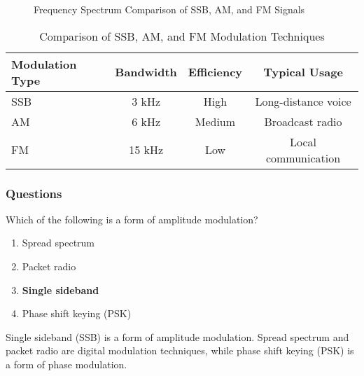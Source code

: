 \begin{figure}[h]
    \centering
    \caption{Frequency Spectrum Comparison of SSB, AM, and FM Signals}
    \label{fig:ssb-spectrum}
\end{figure}

\begin{table}[h]
    \centering
    \begin{tabular}{|l|c|c|c|}
        \hline
        \textbf{Modulation Type} & \textbf{Bandwidth} & \textbf{Efficiency} & \textbf{Typical Usage} \\
        \hline
        SSB & 3 kHz & High & Long-distance voice \\
        AM & 6 kHz & Medium & Broadcast radio \\
        FM & 15 kHz & Low & Local communication \\
        \hline
    \end{tabular}
    \caption{Comparison of SSB, AM, and FM Modulation Techniques}
    \label{tab:modulation-comparison}
\end{table}

\subsubsection{Questions}

\begin{tcolorbox}[colback=gray!10!white,colframe=black!75!black,title={T8A01}]
    Which of the following is a form of amplitude modulation?
    \begin{enumerate}[label=\Alph*),noitemsep]
        \item Spread spectrum
        \item Packet radio
        \item \textbf{Single sideband}
        \item Phase shift keying (PSK)
    \end{enumerate}
\end{tcolorbox}
Single sideband (SSB) is a form of amplitude modulation. Spread spectrum and packet radio are digital modulation techniques, while phase shift keying (PSK) is a form of phase modulation.

